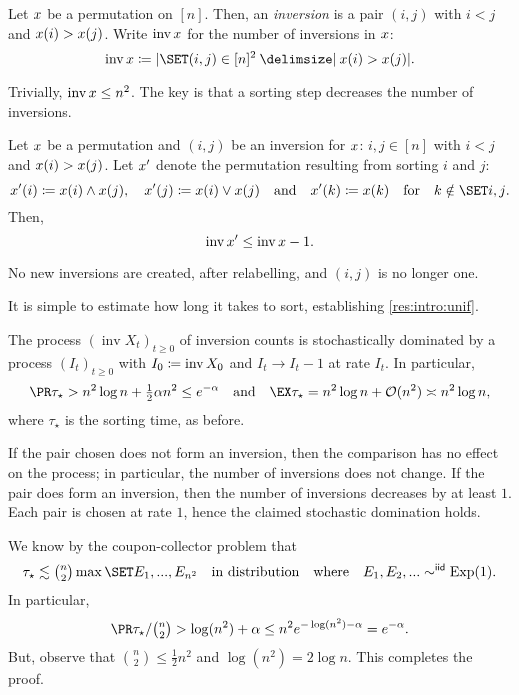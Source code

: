 \documentclass{article}
\DeclareMathOperator{\inv}{inv}
\begin{document}
\begin{defn}
Let $x$ be a permutation on $[n]$.
Then, an \textit{inversion} is a pair $(i,j)$ with $i < j$ and $x(i) > x(j)$.
Write $\inv \xx$ for the number of inversions in $x$:
\[
	\inv \xx
\cq
	\abs{ \set{ (i,j) \in [n]^2 \given \xx(i) > \xx(j) } }.
\]
\end{defn}

Trivially, $\inv \xx \le n^2$.
The key is that a sorting step decreases the number of inversions.

\begin{lem}
Let $x$ be a permutation and $(i,j)$ be an inversion for $x$:
$i,j \in [n]$ with $i < j$ and $x(i) > x(j)$.
Let $x'$ denote the permutation resulting from sorting $i$ and $j$:
\[
	\xx'(i)
\cq
	\xx(i) \wedge \xx(j),
\quad
	\xx'(j)
\cq
	\xx(i) \vee \xx(j)
\Qand
	\xx'(k)
\cq
	\xx(k)
\Qfor
	k \notin \set{i,j}.
\]
Then,
\[
	\inv \xx'
\le
	\inv \xx - 1.
\]
\end{lem}

\begin{Proof}
No new inversions are created, after relabelling,
and $(i,j)$ is no longer one.
\end{Proof}

It is simple to estimate how long it takes to sort, establishing \cref{res:intro:unif}.

\begin{prop}
The process $(\inv X_t)_{t\ge0}$ of inversion counts is stochastically dominated by a process $(I_t)_{t\ge0}$ with $I_0 \cq \inv X_0$ and $I_t \to I_t - 1$ at rate $I_t$.
In particular,
\[
	\pr{ \tau_\star > n^2 \log n + \tfrac12 \alpha n^2 }
\le
	e^{-\alpha}
\Qand
	\ex{ \tau_\star }
=
	n^2 \log n + \Oh{n^2}
\asymp
	n^2 \log n,
\]
where $\tau_\star$ is the sorting time, as before.
\end{prop}

\begin{Proof}
If the pair chosen does not form an inversion, then the comparison has no effect on the process; in particular, the number of inversions does not change.
If the pair does form an inversion, then the number of inversions decreases by at least $1$.
Each pair is chosen at rate $1$, hence the claimed stochastic domination holds.
	
We know by the coupon-collector problem that
\[
	\tau_\star
\lesssim
	\binomt n2
	\max\set{ E_1, ..., E_{n^2} }
\quad
	\text{in distribution}
\Qwhere
	E_1, E_2, ... \sim^\iid \Exp(1).
\]
In particular,
\[
	\pr{ \tau_\star / \binomt n2 > \log(n^2) + \alpha }
\le
	n^2 e^{-\log(n^2) - \alpha}
=
	e^{-\alpha}.
\]
But, observe that $\binom n2 \le \tfrac12 n^2$ and $\log(n^2) = 2 \log n$.
This completes the proof.
\end{Proof}
\end{document}
